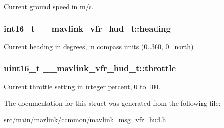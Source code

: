 Current ground speed in m/s. 

\hypertarget{struct____mavlink__vfr__hud__t_a54e333ab2f24a5340e8bd5cbfa91db15}{
\subsubsection[{heading}]{\setlength{\rightskip}{0pt plus 5cm}int16\+\_\+t \+\_\+\+\_\+mavlink\+\_\+vfr\+\_\+hud\+\_\+t\+::heading}}\label{struct____mavlink__vfr__hud__t_a54e333ab2f24a5340e8bd5cbfa91db15}


Current heading in degrees, in compass units (0..360, 0=north) 

\hypertarget{struct____mavlink__vfr__hud__t_ae73bae71b52e32eb61edb4fbccac319c}{
\subsubsection[{throttle}]{\setlength{\rightskip}{0pt plus 5cm}uint16\+\_\+t \+\_\+\+\_\+mavlink\+\_\+vfr\+\_\+hud\+\_\+t\+::throttle}}\label{struct____mavlink__vfr__hud__t_ae73bae71b52e32eb61edb4fbccac319c}


Current throttle setting in integer percent, 0 to 100. 



The documentation for this struct was generated from the following file\+:\begin{DoxyCompactItemize}
\item 
src/main/mavlink/common/\hyperlink{mavlink__msg__vfr__hud_8h}{mavlink\+\_\+msg\+\_\+vfr\+\_\+hud.\+h}\end{DoxyCompactItemize}
